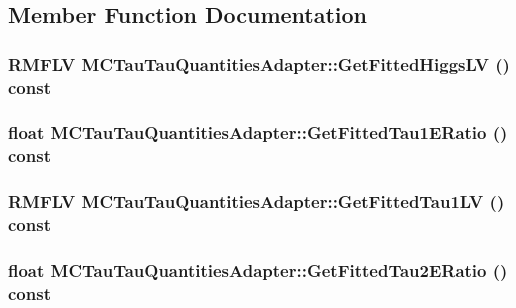\subsection{Member Function Documentation}
\hypertarget{classMCTauTauQuantitiesAdapter_abe749112649b074e94d21ab4d84cec87}{
\subsubsection[{GetFittedHiggsLV}]{\setlength{\rightskip}{0pt plus 5cm}RMFLV MCTauTauQuantitiesAdapter::GetFittedHiggsLV () const}}
\label{classMCTauTauQuantitiesAdapter_abe749112649b074e94d21ab4d84cec87}
\hypertarget{classMCTauTauQuantitiesAdapter_acd68faa4a6ab9608e5424f07ac55d29c}{
\subsubsection[{GetFittedTau1ERatio}]{\setlength{\rightskip}{0pt plus 5cm}float MCTauTauQuantitiesAdapter::GetFittedTau1ERatio () const}}
\label{classMCTauTauQuantitiesAdapter_acd68faa4a6ab9608e5424f07ac55d29c}
\hypertarget{classMCTauTauQuantitiesAdapter_ac11aab0923f8ce008f49b929d7dd0093}{
\subsubsection[{GetFittedTau1LV}]{\setlength{\rightskip}{0pt plus 5cm}RMFLV MCTauTauQuantitiesAdapter::GetFittedTau1LV () const}}
\label{classMCTauTauQuantitiesAdapter_ac11aab0923f8ce008f49b929d7dd0093}
\hypertarget{classMCTauTauQuantitiesAdapter_a1a918c40f13d7999f349eb43b4613697}{
\subsubsection[{GetFittedTau2ERatio}]{\setlength{\rightskip}{0pt plus 5cm}float MCTauTauQuantitiesAdapter::GetFittedTau2ERatio () const}}
